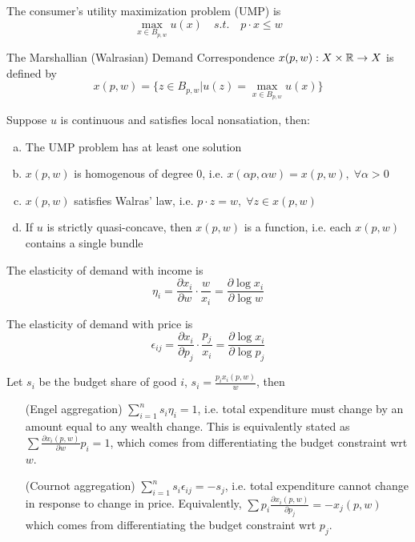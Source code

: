 
\begin{definition}[UMP]
  The consumer's utility maximization problem (UMP) is
  \[
  \max_{x\in B_{p,w}} u(x) \quad s.t. \quad p \cdot x \leq w
  \]
\end{definition}

\begin{definition}
  The Marshallian (Walrasian) Demand Correspondence $x(p,w) : X \times
  {\mathbb R} \to X$ is defined by
  \[
  x(p,w) = \{z \in B_{p,w} | u(z) = \max_{x \in B_{p,w}} u(x) \}
  \]
\end{definition}

\begin{prop}
  Suppose $u$ is continuous and satisfies local nonsatiation, then:
  \begin{enumerate}[(a)]
  \item The UMP problem has at least one solution
  \item $x(p,w)$ is homogenous of degree $0$, i.e. $x(\alpha p, \alpha
    w) = x(p,w), \; \forall \alpha > 0$
  \item $x(p,w)$ satisfies Walras' law, i.e. $p \cdot z = w, \;
    \forall z \in x(p,w)$
  \item If $u$ is strictly quasi-concave, then $x(p,w)$ is a function,
    i.e. each $x(p,w)$ contains a single bundle
  \end{enumerate}
\end{prop}

\begin{definition}

  The elasticity of demand with income is 
  \[
  \eta_i = \frac{\partial x_i}{\partial w} \cdot \frac{w}{x_i}
  = \frac{\partial \log x_i}{\partial \log w}
  \]

  The elasticity of demand with price is 
  \[
  \epsilon_{ij}= \frac{\partial x_i}{\partial p_j} \cdot \frac{p_j}{x_i}
  = \frac{\partial \log x_i}{\partial \log p_j}
  \]
\end{definition}

\begin{prop}
  Let $s_i$ be the budget share of good $i$, $s_i = \frac{p_i
    x_i(p,w)}{w}$, then
  \begin{itemize}
  \item[(Engel aggregation)] $ \sum_{i=1}^n s_i \eta_i = 1$,
    i.e. total expenditure must change by an amount equal to any
    wealth change. This is equivalently stated as $\sum \frac{\partial
      x_i(p,w)}{\partial w} p_i = 1$, which comes from differentiating
    the budget constraint wrt $w$.
  \item[(Cournot aggregation)] $ \sum_{i=1}^n s_i \epsilon_{ij} =
    -s_j$, i.e. total expenditure cannot change in response to change
    in price. Equivalently, $\sum p_i \frac{\partial
      x_i(p,w)}{\partial p_j} = - x_j(p,w)$ which comes from
    differentiating the budget constraint wrt $p_j$.
  \end{itemize}
\end{prop}

